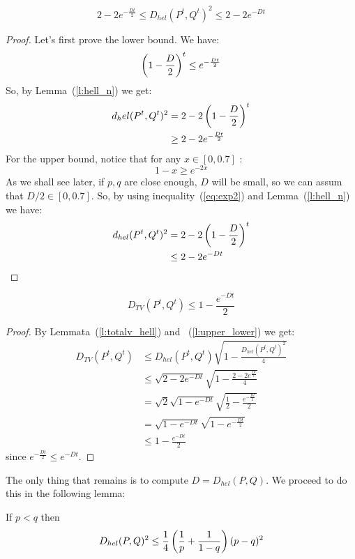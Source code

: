 \begin{lemma}\label{l:upper_lower}
$$
2 - 2e^{-\frac{Dt}{2}} \leq D_{hel}(P^t,Q^t)^2 \leq
2 - 2e^{-Dt}
$$
\end{lemma}
\begin{proof}
Let's first prove the lower bound. We have:
\begin{equation}\label{eq:exp1}
\left(1 - \frac{D}{2}\right)^t \leq e^{-\frac{Dt}{2}}
\end{equation}
So, by Lemma~(\ref{l:hell_n}) we get:
\begin{align*}
d_hel(P^t,Q^t)^2 &= 2 - 2\left(1 - \frac{D}{2}\right)^t \\
&\geq 2 - 2e^{-\frac{Dt}{2}}
\end{align*}
For the upper bound, notice that for any $x\in[0,0.7]$ :
\begin{equation}\label{eq:exp2}
1 -x \geq e^{-2x}
\end{equation}
As we shall see later, if $p,q$ are close enough, $D$ will be small, so we can assum that $D/2 \in [0,0.7]$. So, by using inequality~(\ref{eq:exp2}) and Lemma~(\ref{l:hell_n})
we have:
\begin{align*}
d_{hel}(P^t,Q^t)^2 &= 2 - 2\left(1 - \frac{D}{2}\right)^t \\
&\leq 2 - 2 e^{-Dt}
\end{align*}
\end{proof}
\begin{lemma}\label{l:dtv_lower}
$$
D_{TV}(P^t,Q^t) \leq 1 - \frac{e^{-Dt}}{2}
$$
\end{lemma}
\begin{proof}
By Lemmata~(\ref{l:totalv_hell}) and ~(\ref{l:upper_lower}) we get:
\begin{align*}
D_{TV}(P^t,Q^t) &\leq D_{hel}(P^t,Q^t) \sqrt{1-\frac{D_{hel}(P^t,Q^t)^2}{4}}\\
&\leq \sqrt{2 - 2e^{-Dt}} \sqrt{1 - \frac{2 - 2e^{\frac{Dt}{t}}}{4}}\\
&= \sqrt{2}\sqrt{1 - e^{-Dt}} \sqrt{\frac{1}{2} - \frac{e^{-\frac{Dt}{2}}}{2}}\\
&= \sqrt{1 - e^{-Dt}} \sqrt{1 - e^{-\frac{Dt}{2}}}\\
&\leq 1 - \frac{e^{-Dt}}{2}
\end{align*}
since $e^{-\frac{Dt}{2}} \leq e^{-Dt}$. 
\end{proof}
The only thing that remains is to compute $D = D_{hel}(P,Q)$. We proceed to do this in the following lemma:
\begin{lemma}\label{l:hell}
If $p<q$ then
$$
D_{hel}(P,Q)^2 \leq \frac{1}{4}\left(\frac{1}{p} + \frac{1}{1-q}\right)(p-q)^2
$$
\end{lemma}
